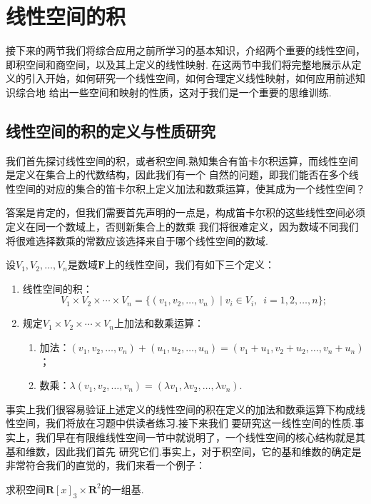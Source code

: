 \section{线性空间的积}
接下来的两节我们将综合应用之前所学习的基本知识，介绍两个重要的线性空间，即积空间和商空间，以及其上定义的线性映射.
在这两节中我们将完整地展示从定义的引入开始，如何研究一个线性空间，如何合理定义线性映射，如何应用前述知识综合地
给出一些空间和映射的性质，这对于我们是一个重要的思维训练.

\subsection{线性空间的积的定义与性质研究}
我们首先探讨线性空间的积，或者积空间.熟知集合有笛卡尔积运算，而线性空间是定义在集合上的代数结构，因此我们有一个
自然的问题，即我们能否在多个线性空间的对应的集合的笛卡尔积上定义加法和数乘运算，使其成为一个线性空间？

答案是肯定的，但我们需要首先声明的一点是，构成笛卡尔积的这些线性空间必须定义在同一个数域上，否则新集合上的数乘
我们将很难定义，因为数域不同我们将很难选择数乘的常数应该选择来自于哪个线性空间的数域.
\begin{definition}\label{def:8:积空间}
    设$V_1,V_2,\ldots,V_n$是数域$\mathbf{F}$上的线性空间，我们有如下三个定义：
    \begin{enumerate}
        \item 线性空间的积：
        \[V_1 \times V_2 \times \cdots \times V_n=\{(v_1,v_2,\ldots,v_n)\mid v_i \in V_i,\enspace i=1,2,\ldots,n\};\]

        \item 规定$V_1 \times V_2 \times \cdots \times V_n$上加法和数乘运算：
        \begin{enumerate}
            \item 加法：$(v_1,v_2,\ldots,v_n)+(u_1,u_2,\ldots,u_n)=(v_1+u_1,v_2+u_2,\ldots,v_n+u_n)$；
            \item 数乘：$\lambda(v_1,v_2,\ldots,v_n)=(\lambda v_1,\lambda v_2,\ldots,\lambda v_n)$.
        \end{enumerate}
    \end{enumerate}
\end{definition}

事实上我们很容易验证上述定义的线性空间的积在定义的加法和数乘运算下构成线性空间，我们将放在习题中供读者练习.接下来我们
要研究这一线性空间的性质.事实上，我们早在有限维线性空间一节中就说明了，一个线性空间的核心结构就是其基和维数，因此我们首先
研究它们.事实上，对于积空间，它的基和维数的确定是非常符合我们的直觉的，我们来看一个例子：
\begin{example}
    求积空间$\mathbf{R}[x]_3\times\mathbf{R}^2$的一组基.
\end{example}

